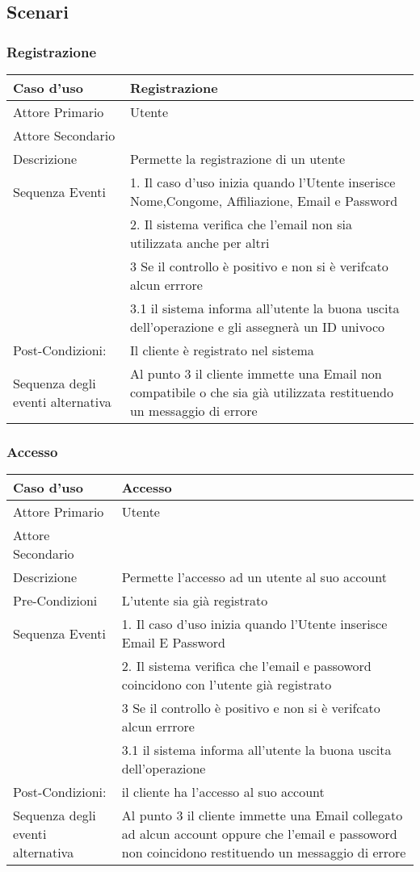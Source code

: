 \subsection{Scenari}
\label{sec:scenari}
\subsubsection{Registrazione}
\begin{tabular}{|p{1cm}|p{10cm}}
\hline 
\rowcolor{Skyblue}
Caso d'uso & Registrazione \\
\hline
Attore Primario & Utente\\
\hline
Attore Secondario & \\
\hline
Descrizione & Permette la registrazione di un utente\\
\hline
Sequenza Eventi&1.  Il caso d'uso inizia quando l'Utente inserisce Nome,Congome, Affiliazione, Email e Password\\
& 2. Il sistema verifica che l'email non sia utilizzata anche per altri\\ 
&3 Se il controllo è positivo e non si è verifcato alcun errrore\\
&3.1 il sistema informa all'utente la buona uscita dell'operazione e gli assegnerà un ID univoco\\
\hline
Post-Condizioni: & Il cliente è registrato nel sistema \\
\hline
Sequenza degli eventi alternativa & Al punto 3 il cliente immette una Email non compatibile o che sia già utilizzata restituendo un messaggio di errore\\
\hline
\end{tabular}


\subsubsection{Accesso}
\begin{tabular}{|p{1cm}|p{10cm}}
\hline 
\rowcolor{Skyblue}
Caso d'uso & Accesso \\
\hline
Attore Primario & Utente\\
\hline
Attore Secondario & \\
\hline
Descrizione & Permette l'accesso ad un utente al suo account\\
\hline
Pre-Condizioni& L'utente sia già registrato\\
\hline
Sequenza Eventi&1.  Il caso d'uso inizia quando l'Utente inserisce Email E Password\\
& 2. Il sistema verifica che l'email e  passoword coincidono con l'utente già registrato \\ 
&3 Se il controllo è positivo e non si è verifcato alcun errrore\\
&3.1 il sistema informa all'utente la buona uscita dell'operazione\\
\hline
Post-Condizioni: &il cliente ha l'accesso al suo account \\
\hline
Sequenza degli eventi alternativa & Al punto 3 il cliente immette una Email collegato ad alcun account  oppure che l'email e passoword non coincidono restituendo un messaggio di errore\\
\hline
\end{tabular}

